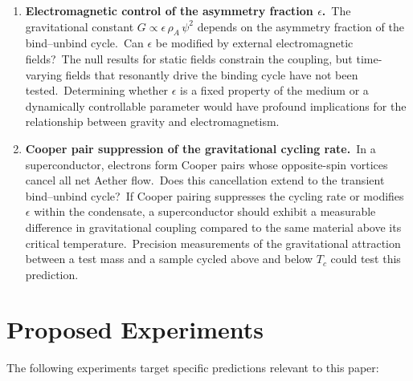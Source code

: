 ﻿\documentclass[12pt,letterpaper]{article}
\newcommand{\rhoa}{\rho_{\!A}}
\begin{document}
\begin{enumerate}[leftmargin=2em]
  \item \textbf{Electromagnetic control of the asymmetry fraction
    $\epsilon$.}\ The gravitational constant $G \propto \epsilon\,\rhoa\,\psi^2$
    depends on the asymmetry fraction of the bind--unbind cycle.\ Can
    $\epsilon$ be modified by external electromagnetic fields?\ The null
    results for static fields \cite{hathaway2021,tajmar2024} constrain the
    coupling, but time-varying fields that resonantly drive the binding
    cycle have not been tested.\ Determining whether $\epsilon$ is a
    fixed property of the medium or a dynamically controllable parameter
    would have profound implications for the relationship between gravity
    and electromagnetism.

  \item \textbf{Cooper pair suppression of the gravitational cycling rate.}\
    In a superconductor, electrons form Cooper pairs whose opposite-spin
    vortices cancel all net Aether flow.\ Does this cancellation extend to
    the transient bind--unbind cycle?\ If Cooper pairing suppresses the
    cycling rate or modifies $\epsilon$ within the condensate, a
    superconductor should exhibit a measurable difference in gravitational
    coupling compared to the same material above its critical temperature.\
    Precision measurements of the gravitational attraction between a test
    mass and a sample cycled above and below $T_c$ could test this
    prediction.



\end{enumerate}



\section{Proposed Experiments}

The following experiments target specific predictions relevant to this paper:
\end{document}
